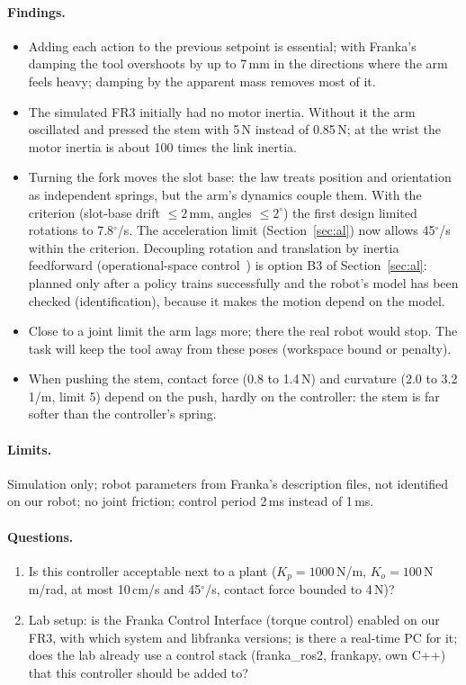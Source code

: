\paragraph{Findings.}
\begin{itemize}
  \item Adding each action to the previous setpoint is essential; with Franka's damping the tool overshoots by up
        to 7\,mm in the directions where the arm feels heavy; damping by the apparent mass removes most of it.
  \item The simulated FR3 initially had no motor inertia. Without it the arm oscillated and pressed the stem with
        5\,N instead of 0.85\,N; at the wrist the motor inertia is about 100 times the link inertia.
  \item Turning the fork moves the slot base: the law treats position and orientation as independent springs, but
        the arm's dynamics couple them. With the criterion (slot-base drift $\le 2$\,mm, angles $\le 2^\circ$) the first
        design limited rotations to 7.8$^\circ$/s. The acceleration limit (Section~\ref{sec:al}) now allows
        45$^\circ$/s within the criterion. Decoupling rotation and translation by inertia feedforward
        (operational-space control~\cite{khatib1987}) is option B3 of Section~\ref{sec:al}: planned only after a
        policy trains successfully and the robot's model has been checked (identification), because it makes the
        motion depend on the model.
  \item Close to a joint limit the arm lags more; there the real robot would stop. The task will keep the tool away
        from these poses (workspace bound or penalty).
  \item When pushing the stem, contact force (0.8 to 1.4\,N) and curvature (2.0 to 3.2\,1/m, limit 5) depend on
        the push, hardly on the controller: the stem is far softer than the controller's spring.
\end{itemize}

\paragraph{Limits.} Simulation only; robot parameters from Franka's description files, not identified on our
robot; no joint friction; control period 2\,ms instead of 1\,ms.

\paragraph{Questions.}
\begin{enumerate}
  \item Is this controller acceptable next to a plant ($K_p = 1000$\,N/m, $K_o = 100$\,N\,m/rad, at most 10\,cm/s and
        45$^\circ$/s, contact force bounded to 4\,N)?
  \item Lab setup: is the Franka Control Interface (torque control) enabled on our FR3, with which system and
        libfranka versions; is there a real-time PC for it; does the lab already use a control stack
        (franka\_ros2, frankapy, own C++) that this controller should be added to?
\end{enumerate}

